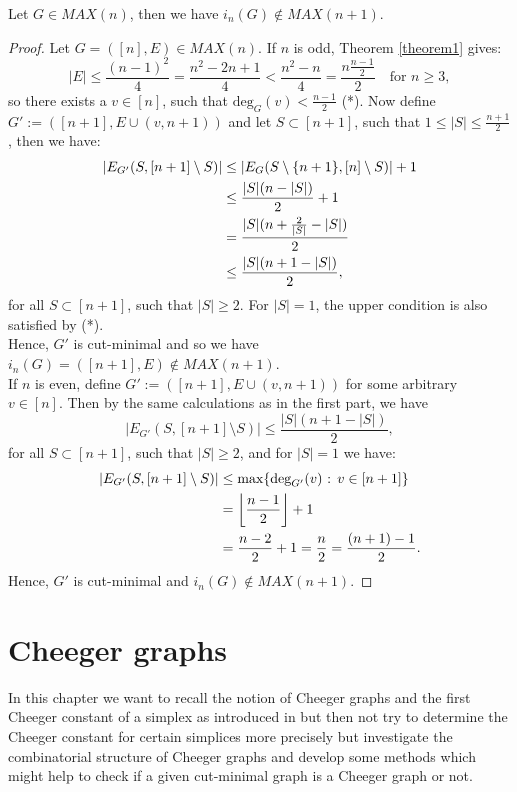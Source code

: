 \begin{prop}
Let \(G\in MAX(n)\), then we have \(i_n(G)\notin MAX(n+1)\).
\begin{proof}
Let \(G=([n],E)\in MAX(n)\). If \(n\) is odd, Theorem \ref{theorem1} gives:
\[
|E|\leq\frac{(n-1)^2}{4}=\frac{n^2-2n+1}{4}<\frac{n^2-n}{4}=\frac{n\frac{n-1}{2}}{2}\quad\text{for }n\geq 3,
\]
so there exists a \(v\in [n]\), such that \(\text{deg}_G(v)<\frac{n-1}{2}\) (*). Now define\\
\(G':=([n+1],E\cup (v,n+1))\) and let \(S\subset [n+1]\), such that \(1\leq |S|\leq\frac{n+1}{2}\), then we have:
\begin{align}
|E_{G'}(S,[n+1]\setminus S)|&\leq |E_G(S\setminus\{n+1\},[n]\setminus S)|+1\notag\\
&\leq\frac{|S|(n-|S|)}{2}+1\notag\\
&=\frac{|S|(n+\frac{2}{|S|}-|S|)}{2}\notag\\
&\leq\frac{|S|(n+1-|S|)}{2},\notag
\end{align}
for all \(S\subset [n+1]\), such that \(|S|\geq 2\). For \(|S|=1\), the upper condition is also satisfied by (*).\\
Hence, \(G'\) is cut-minimal and so we have \(i_n(G)=([n+1],E)\notin MAX(n+1)\).\\
If \(n\) is even, define \(G':=([n+1],E\cup (v,n+1))\) for some arbitrary \(v\in [n]\). Then by the same calculations as in the first part, we have
\[
|E_{G'}(S,[n+1]\setminus S)|\leq\frac{|S|(n+1-|S|)}{2},
\]
for all \(S\subset [n+1]\), such that \(|S|\geq 2\), and for \(|S|=1\) we have:
\begin{align}
|E_{G'}(S,[n+1]\setminus S)|&\leq\text{max}\{\text{deg}_{G'}(v)\text{ : }v\in[n+1]\}\notag\\
&=\left\lfloor\frac{n-1}{2}\right\rfloor +1\notag\\
&=\frac{n-2}{2}+1=\frac{n}{2}=\frac{(n+1)-1}{2}.\notag
\end{align}
Hence, \(G'\) is cut-minimal and \(i_n(G)\notin MAX(n+1)\).
\end{proof}
\end{prop}

\section{Cheeger graphs}
In this chapter we want to recall the notion of Cheeger graphs and the first Cheeger constant of a simplex as introduced in \cite{1} but then not try to determine the Cheeger constant for certain simplices more precisely but investigate the combinatorial structure of Cheeger graphs and develop some methods which might help to check if a given cut-minimal graph is a Cheeger graph or not.

